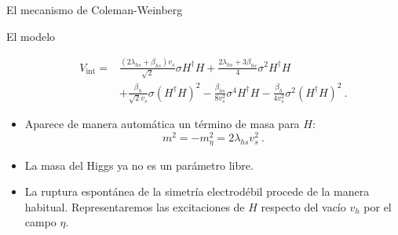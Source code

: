 \documentclass{beamer}
\begin{document}
\begin{frame}{El mecanismo de Coleman-Weinberg}
\begin{frame}{El modelo}
\begin{itemize}
\begin{subequations}
\begin{align}
V_\mathrm{int} =& \frac{(2\lambda_{hs} + \beta_{hs})v_s}{\sqrt{2}}\sigma H^\dagger H + \frac{2\lambda_{hs} + 3\beta_{hs}}{4}\sigma^2 H^\dagger H\nonumber\\ &+ \frac{\beta_h}{\sqrt{2} v_s}\sigma (H^\dagger H)^2 - \frac{\beta_{hs}}{8 v_s^2}\sigma^4 H^\dagger H- \frac{\beta_h}{4 v_s^2}\sigma^2 (H^\dagger H)^2\ . \label{eq:interlagr}
\end{align}
\end{subequations}
\item<only@5> Aparece de manera automática un término de masa para $H$:
\begin{equation}
m^2 = -m_\eta^2 = 2 \lambda_{hs} v_s^2\ .
\end{equation}
\item<only@5> La masa del Higgs ya no es un parámetro libre.
\item<only@5> La ruptura espontánea de la simetría electrodébil procede de la manera habitual. Representaremos las excitaciones de $H$ respecto del vacío $v_h$ por el campo $\eta$.	 

\end{itemize}
\end{frame}


\end{frame}
\end{document}
